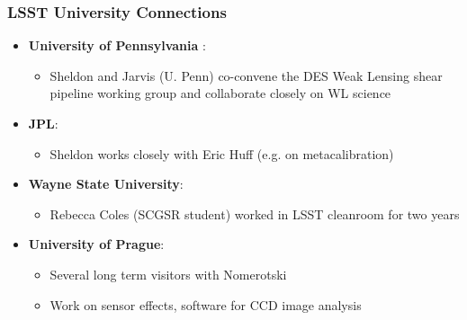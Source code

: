 \documentclass[aspectratio=169]{beamer}
\begin{document}
\begin{frame}
  \frametitle{LSST University Connections}

  \begin{itemize}

    \item \textbf{University of Pennsylvania }:
        \begin{itemize}
            \item Sheldon and Jarvis (U. Penn) co-convene the DES Weak Lensing 
                shear pipeline working group and collaborate closely on WL science
        \end{itemize}

    \item \textbf{JPL}:
        \begin{itemize}
            \item Sheldon works closely with Eric Huff (e.g. on metacalibration)
        \end{itemize}


    \item \textbf{Wayne State University}:
      \begin{itemize}
          \item Rebecca Coles (SCGSR student) worked in LSST cleanroom
            for two years
      \end{itemize}


    \item \textbf{University of Prague}:
      \begin{itemize}
          \item Several long term visitors with Nomerotski
          \item Work on sensor effects, software for CCD image analysis
      \end{itemize}




\end{itemize}
\end{frame}
\end{document}
